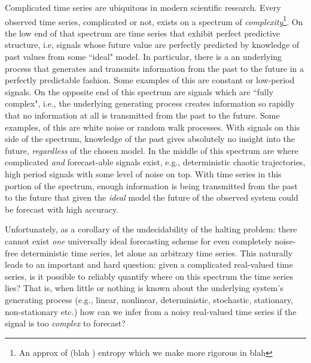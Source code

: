 Complicated time series are ubiquitous in modern scientific research. 
Every observed time series, complicated or not, exists on a spectrum of \emph{complexity}\footnote{An approx of (blah ) entropy which we make more rigorous in blah}. On the low end of that spectrum are time series that exhibit perfect predictive structure, i.e, signals whose future value are perfectly predicted by knowledge of past values from some ``ideal" model. In particular, there is a an underlying process that generates and transmits information from the past to the future in a perfectly predictable fashion. Some examples of this are constant or low-period signals. On the opposite end of this spectrum are signals which are ``fully complex", i.e., the underlying generating process creates information so rapidly that no information at all is transmitted from the past to the future. Some examples, of this are white noise or random walk processes. With signals on this side of the spectrum, knowledge of the past gives absolutely no insight into the future, \emph{regardless} of the chosen model.  In the middle of this spectrum are where complicated \emph{and} forecast-able signals exist, e.g., deterministic chaotic trajectories, high period signals with some level of noise on top. With time series in this portion of the spectrum, enough information is being transmitted from the past to the future that given the \emph{ideal} model the future of the observed system could be forecast with high accuracy. 

Unfortunately, as a corollary of the undecidability of the halting problem: there cannot exist \emph{one} universally ideal forecasting scheme for even completely noise-free deterministic time series\cite{sfi-prediction}, let alone an arbitrary time series. This naturally leads to an important and hard question: given a complicated real-valued time series, is it possible to reliably quantify where on this spectrum the time series lies? That is, when little or nothing is known about the underlying system's generating process (e.g., linear, nonlinear, deterministic, stochastic, stationary, non-stationary etc.) how can we infer from a noisy real-valued time series if the signal is too \emph{complex} to forecast?







